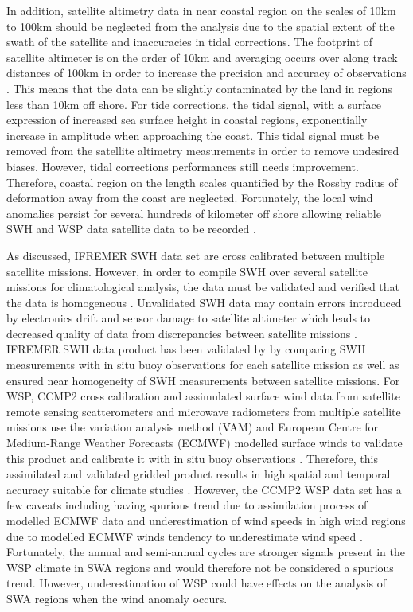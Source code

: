 \documentclass[draft,linenumbers]{agujournal2018}
\begin{document}
In addition, satellite altimetry data in near coastal region on the scales of 10km to 100km should be neglected from the analysis due to the spatial extent of the swath of the satellite and inaccuracies in tidal corrections. The footprint of satellite altimeter is on the order of 10km and averaging occurs over along track distances of 100km in order to increase the precision and accuracy of observations \cite{chelton2001satellite}. This means that the data can be slightly contaminated by the land in regions less than 10km off shore. For tide corrections, the tidal signal, with a surface expression of increased sea surface height in coastal regions, exponentially increase in amplitude when approaching the coast. This tidal signal must be removed from the satellite altimetry measurements in order to remove undesired biases. However, tidal corrections performances still needs improvement. Therefore, coastal region on the length scales quantified by the Rossby radius of deformation away from the coast are neglected. Fortunately, the local wind anomalies persist for several hundreds of kilometer off shore allowing reliable SWH and WSP data satellite data to be recorded \cite{winant1988marine}. 

As discussed, IFREMER SWH data set are cross calibrated between multiple satellite missions. However, in order to compile SWH over several satellite missions for climatological analysis, the data must be validated and verified that the data is homogeneous \cite{queffeulou2004long}. Unvalidated SWH data may contain errors introduced by electronics drift and sensor damage to satellite altimeter which leads to decreased quality of data from discrepancies between satellite missions \cite{queffeulou2004long}. IFREMER SWH data product has been validated by \citet{queffeulou2004long} by comparing SWH measurements with in situ buoy observations for each satellite mission as well as ensured near homogeneity of SWH measurements between satellite missions. For WSP, CCMP2 cross calibration and assimulated surface wind data from satellite remote sensing scatterometers and microwave radiometers from multiple satellite missions use the variation analysis method (VAM) and European Centre for Medium-Range Weather Forecasts (ECMWF) modelled surface winds to validate this product and calibrate it with in situ buoy observations \cite{atlas2011cross}. Therefore, this assimilated and validated gridded product results in high spatial and temporal accuracy suitable for climate studies \cite{Atlas2011Remote}. However, the CCMP2 WSP data set has a few caveats including having spurious trend due to assimilation process of modelled ECMWF data and underestimation of wind speeds in high wind regions due to modelled ECMWF winds tendency to underestimate wind speed \cite{Atlas2011Remote}. Fortunately, the annual and semi-annual cycles are stronger signals present in the WSP climate in SWA regions and would therefore not be considered a spurious trend. However, underestimation of WSP could have effects on the analysis of SWA regions when the wind anomaly occurs. 
\end{document}
